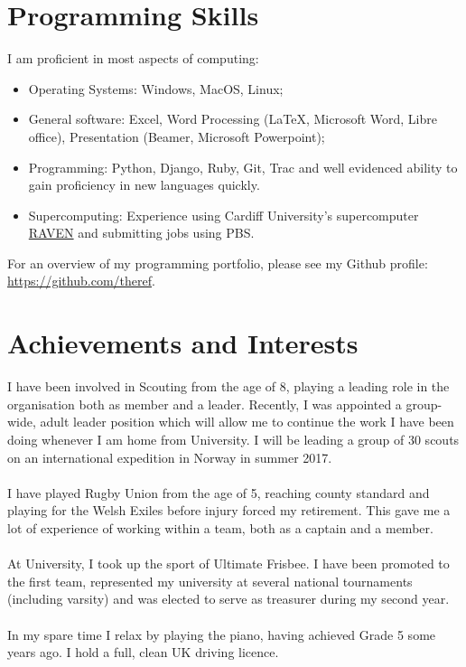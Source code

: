 \documentclass[a4paper]{article}
\begin{document}
\section{Programming Skills}
I am proficient in most aspects of computing:

\begin{itemize}
    \item Operating Systems: Windows, MacOS, Linux;
    \item General software: Excel, Word Processing (\LaTeX, Microsoft Word, Libre office), Presentation (Beamer, Microsoft Powerpoint);
    \item Programming: Python, Django, Ruby, Git, Trac and well evidenced ability to gain proficiency in new languages quickly.
    \item Supercomputing: Experience using Cardiff University's supercomputer \href{http://www.cardiff.ac.uk/advanced-research-computing}{RAVEN} and submitting jobs using PBS.
\end{itemize}

For an overview of my programming portfolio, please see my Github profile: \url{https://github.com/theref}.

\section{Achievements and Interests}
I have been involved in Scouting from the age of 8, playing a leading role in the organisation both as member and a leader.
Recently, I was appointed a group-wide, adult leader position which will allow me to continue the work I have been doing whenever I am home from University.
I will be leading a group of 30 scouts on an international expedition in Norway in summer 2017.\\
\\
I have played Rugby Union from the age of 5, reaching county standard and playing for the Welsh Exiles before injury forced my retirement.
This gave me a lot of experience of working within a team, both as a captain and a member. \\
\\
At University, I took up the sport of Ultimate Frisbee. I have been promoted to the first team, represented my university at several national tournaments (including varsity) and was elected to serve as treasurer during my second year. \\
\\
In my spare time I relax by playing the piano, having achieved Grade 5 some years ago. I hold a full, clean UK driving licence.
\end{document}
